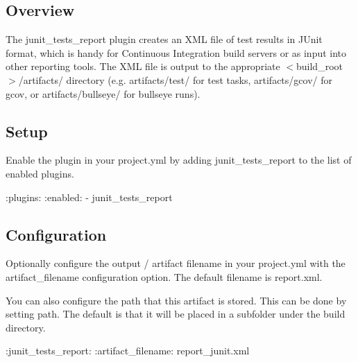 \subsection*{Overview}

The junit\+\_\+tests\+\_\+report plugin creates an X\+ML file of test results in J\+Unit format, which is handy for Continuous Integration build servers or as input into other reporting tools. The X\+ML file is output to the appropriate {\ttfamily $<$build\+\_\+root$>$/artifacts/} directory (e.\+g. {\ttfamily artifacts/test/} for test tasks, {\ttfamily artifacts/gcov/} for gcov, or {\ttfamily artifacts/bullseye/} for bullseye runs).

\subsection*{Setup}

Enable the plugin in your project.\+yml by adding {\ttfamily junit\+\_\+tests\+\_\+report} to the list of enabled plugins.


\begin{DoxyCode}
:plugins:
  :enabled:
    - junit\_tests\_report
\end{DoxyCode}


\subsection*{Configuration}

Optionally configure the output / artifact filename in your project.\+yml with the {\ttfamily artifact\+\_\+filename} configuration option. The default filename is {\ttfamily report.\+xml}.

You can also configure the path that this artifact is stored. This can be done by setting {\ttfamily path}. The default is that it will be placed in a subfolder under the {\ttfamily build} directory.


\begin{DoxyCode}
:junit\_tests\_report:
  :artifact\_filename: report\_junit.xml
\end{DoxyCode}
 